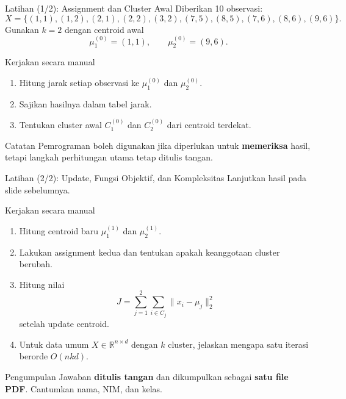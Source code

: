 \documentclass[aspectratio=169,11pt]{beamer}
\begin{document}
\begin{frame}{Latihan (1/2): Assignment dan Cluster Awal}
\small
Diberikan 10 observasi:
\[
X=
\{(1,1),(1,2),(2,1),(2,2),(3,2),
(7,5),(8,5),(7,6),(8,6),(9,6)\}.
\]
Gunakan $k=2$ dengan centroid awal
\[
\mu_1^{(0)}=(1,1),
\qquad
\mu_2^{(0)}=(9,6).
\]

\begin{block}{Kerjakan secara manual}
\begin{enumerate}
\item Hitung jarak setiap observasi ke $\mu_1^{(0)}$ dan $\mu_2^{(0)}$.
\item Sajikan hasilnya dalam tabel jarak.
\item Tentukan cluster awal $C_1^{(0)}$ dan $C_2^{(0)}$ dari centroid terdekat.
\end{enumerate}
\end{block}

\begin{alertblock}{Catatan}
\footnotesize
Pemrograman boleh digunakan jika diperlukan untuk \textbf{memeriksa} hasil, tetapi langkah perhitungan utama tetap ditulis tangan.
\end{alertblock}
\end{frame}

\begin{frame}{Latihan (2/2): Update, Fungsi Objektif, dan Kompleksitas}
\small
Lanjutkan hasil pada slide sebelumnya.

\begin{block}{Kerjakan secara manual}
\begin{enumerate}
\item Hitung centroid baru $\mu_1^{(1)}$ dan $\mu_2^{(1)}$.
\item Lakukan assignment kedua dan tentukan apakah keanggotaan cluster berubah.
\item Hitung nilai
\[
J=\sum_{j=1}^{2}\sum_{i\in C_j}\|x_i-\mu_j\|_2^2
\]
setelah update centroid.
\item Untuk data umum $X\in\mathbb{R}^{n\times d}$ dengan $k$ cluster, jelaskan mengapa satu iterasi berorde $O(nkd)$.
\end{enumerate}
\end{block}

\begin{alertblock}{Pengumpulan}
\footnotesize
Jawaban \textbf{ditulis tangan} dan dikumpulkan sebagai \textbf{satu file PDF}. Cantumkan nama, NIM, dan kelas.
\end{alertblock}
\end{frame}
\end{document}
